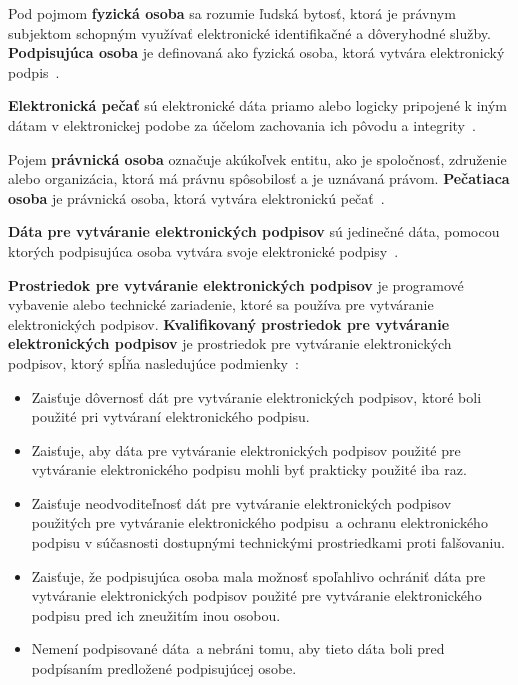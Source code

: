 \documentclass[
  digital,     %
  oneside,     %
  nosansbold,  %
  nocolorbold, %
  lof,         %
  nolot,         %
]{fithesis4}
\begin{document}
Pod pojmom \textbf{fyzická osoba} sa rozumie ľudská bytosť, ktorá je právnym subjektom schopným využívať elektronické identifikačné a dôveryhodné služby. \textbf{Podpisujúca osoba} je definovaná ako fyzická osoba, ktorá vytvára elektronický podpis~\cite[čl.~3,~odst.~9]{eidas2024}.

\textbf{Elektronická pečať} sú elektronické dáta priamo alebo logicky pripojené k iným dátam v elektronickej podobe za účelom zachovania ich pôvodu a integrity~\cite[čl.~3,~odst.~25]{eidas2024}.

Pojem \textbf{právnická osoba} označuje akúkoľvek entitu, ako je spoločnosť, združenie alebo organizácia, ktorá má právnu spôsobilosť a je uznávaná právom. \textbf{Pečatiaca osoba} je právnická osoba, ktorá vytvára elektronickú pečať~\cite[čl.~3,~odst.~9]{eidas2024}.

\textbf{Dáta pre vytváranie elektronických podpisov} sú jedinečné dáta, pomocou ktorých podpisujúca osoba vytvára svoje elektronické podpisy~\cite[čl.~3,~odst.~13]{eidas2024}.

\textbf{Prostriedok pre vytváranie elektronických podpisov} je programové vybavenie alebo technické zariadenie, ktoré sa používa pre vytváranie elektronických podpisov\cite[čl.~3,~odst.~22]{eidas2024}. \textbf{Kvalifikovaný prostriedok pre vytváranie elektronických podpisov} je prostriedok pre vytváranie elektronických podpisov, ktorý spĺňa nasledujúce podmienky~\cite[čl.~3,~odst.~23]{eidas2024}:

\begin{itemize}
  \item Zaisťuje dôvernosť dát pre vytváranie elektronických podpisov, ktoré boli použité pri vytváraní elektronického podpisu.
  \item Zaisťuje, aby dáta pre vytváranie elektronických podpisov použité pre vytváranie elektronického podpisu mohli byť prakticky použité iba raz.
  \item Zaisťuje neodvoditeľnosť dát pre vytváranie elektronických podpisov použitých pre vytváranie elektronického podpisu~a ochranu elektronického podpisu v súčasnosti dostupnými technickými prostriedkami proti falšovaniu.
  \item Zaisťuje, že podpisujúca osoba mala možnosť spoľahlivo ochrániť dáta pre vytváranie elektronických podpisov použité pre vytváranie elektronického podpisu pred ich zneužitím inou osobou.
  \item Nemení podpisované dáta~a nebráni tomu, aby tieto dáta boli pred podpísaním predložené podpisujúcej osobe.~\cite[príloha II]{eidas2024}
\end{itemize}
\end{document}
